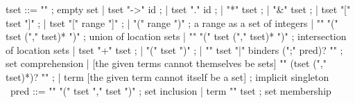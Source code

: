 \begin{syntax}
  tset ::= "\empty" ; empty set
       | tset "->" id ;
       | tset "." id ;
       | "*" tset ;
       | "&" tset ;
       | tset "[" tset "]" ;
       | tset "[" range "]" ;
       | "(" range ")" ; a range as a set of integers
       | "\union" "(" tset ("," tset)* ")" ; union of location sets
       | "\inter" "(" tset ("," tset)* ")" ; intersection of location sets
       | tset "+" tset ;
       | "(" tset ")" ;
       | "{" tset "|" binders (";" pred)? "}" ; set comprehension
       | {[the given terms cannot themselves be sets] 
          "{" (tset ("," tset)*)? "}" };
       | term [the given term cannot itself be a set] ; implicit singleton
       \
  pred ::= "\subset" "(" tset "," tset ")" ; set inclusion
       | term "\in" tset ; set membership
\end{syntax}

